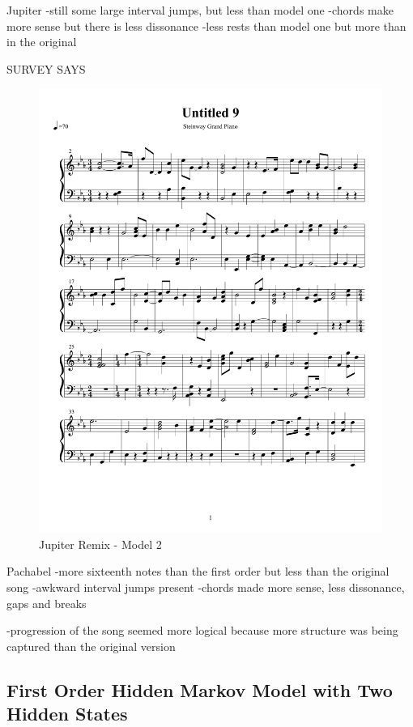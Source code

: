 \documentclass{article} %
\begin{document}
Jupiter
-still some large interval jumps, but less than model one
-chords make more sense but there is less dissonance
-less rests than model one but more than in the original


SURVEY SAYS


\begin{figure}[H]
\centering
\caption{Jupiter Remix - Model 2}
\includegraphics [scale = 0.6] {JupiterRemix2-cropped.pdf}
\end{figure}

Pachabel
-more sixteenth notes than the first order but less than the original song
-awkward interval jumps present
-chords made more sense, less dissonance, gaps and breaks


-progression of the song seemed more logical because more structure was being captured than the original version


\subsection{First Order Hidden Markov Model with Two Hidden States}
\end{document}
